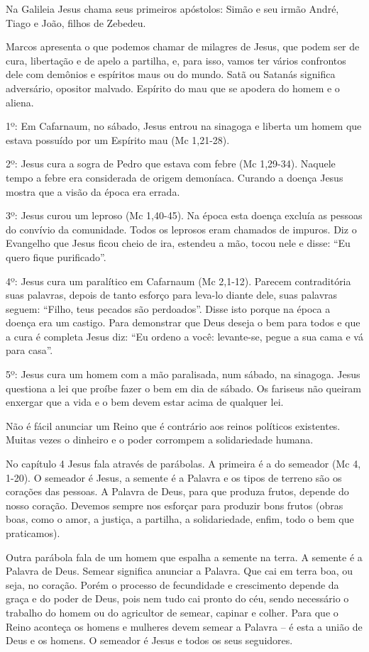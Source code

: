 \documentclass[
]{book}
\begin{document}
Na Galileia Jesus chama seus primeiros apóstolos: Simão e seu irmão André, Tiago e João, filhos de Zebedeu.

Marcos apresenta o que podemos chamar de milagres de Jesus, que podem ser de cura, libertação e de apelo a partilha, e, para isso, vamos ter vários confrontos dele com demônios e espíritos maus ou do mundo. Satã ou Satanás significa adversário, opositor malvado. Espírito do mau que se apodera do homem e o aliena.

1º: Em Cafarnaum, no sábado, Jesus entrou na sinagoga e liberta um homem que estava possuído por um Espírito mau (Mc 1,21-28).

2º: Jesus cura a sogra de Pedro que estava com febre (Mc 1,29-34). Naquele tempo a febre era considerada de origem demoníaca. Curando a doença Jesus mostra que a visão da época era errada.

3º: Jesus curou um leproso (Mc 1,40-45). Na época esta doença excluía as pessoas do convívio da comunidade. Todos os leprosos eram chamados de impuros. Diz o Evangelho que Jesus ficou cheio de ira, estendeu a mão, tocou nele e disse: ``Eu quero fique purificado''.

4º: Jesus cura um paralítico em Cafarnaum (Mc 2,1-12). Parecem contraditória suas palavras, depois de tanto esforço para leva-lo diante dele, suas palavras seguem: ``Filho, teus pecados são perdoados''. Disse isto porque na época a doença era um castigo. Para demonstrar que Deus deseja o bem para todos e que a cura é completa Jesus diz: ``Eu ordeno a você: levante-se, pegue a sua cama e vá para casa''.

5º: Jesus cura um homem com a mão paralisada, num sábado, na sinagoga. Jesus questiona a lei que proíbe fazer o bem em dia de sábado. Os fariseus não queiram enxergar que a vida e o bem devem estar acima de qualquer lei.

Não é fácil anunciar um Reino que é contrário aos reinos políticos existentes. Muitas vezes o dinheiro e o poder corrompem a solidariedade humana.

No capítulo 4 Jesus fala através de parábolas. A primeira é a do semeador (Mc 4, 1-20). O semeador é Jesus, a semente é a Palavra e os tipos de terreno são os corações das pessoas. A Palavra de Deus, para que produza frutos, depende do nosso coração. Devemos sempre nos esforçar para produzir bons frutos (obras boas, como o amor, a justiça, a partilha, a solidariedade, enfim, todo o bem que praticamos).

Outra parábola fala de um homem que espalha a semente na terra. A semente é a Palavra de Deus. Semear significa anunciar a Palavra. Que cai em terra boa, ou seja, no coração. Porém o processo de fecundidade e crescimento depende da graça e do poder de Deus, pois nem tudo cai pronto do céu, sendo necessário o trabalho do homem ou do agricultor de semear, capinar e colher. Para que o Reino aconteça os homens e mulheres devem semear a Palavra -- é esta a união de Deus e os homens. O semeador é Jesus e todos os seus seguidores.
\end{document}
